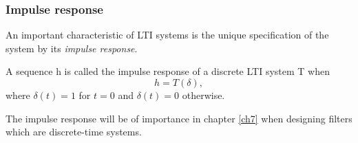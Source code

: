 \subsubsection{Impulse response}
An important characteristic of LTI systems is the unique specification of the system by its \textit{impulse response}.
\begin{definition}\label{def:impulse_response}
A sequence h is called the impulse response of a discrete LTI system T when
\begin{equation}
h=T(\delta),
\end{equation}
where $\delta(t)=1$ for $t=0$ and $\delta(t)=0$ otherwise.
\end{definition}
The impulse response will be of importance in chapter \ref{ch7} when designing filters which are discrete-time systems.